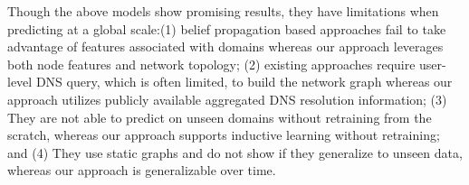 Though the above models show promising results, they have limitations when predicting at a global scale:(1) belief propagation based approaches fail to take advantage of features associated with domains whereas our approach leverages both node features and network topology; (2) existing approaches require user-level DNS query, which is often limited, to build the network graph whereas our approach utilizes publicly available aggregated DNS resolution information; (3) They are not able to predict on unseen domains without retraining from the scratch, whereas our approach supports inductive learning without retraining; and (4) They use static graphs and do not show if they generalize to unseen data, whereas our approach is generalizable over time. 
